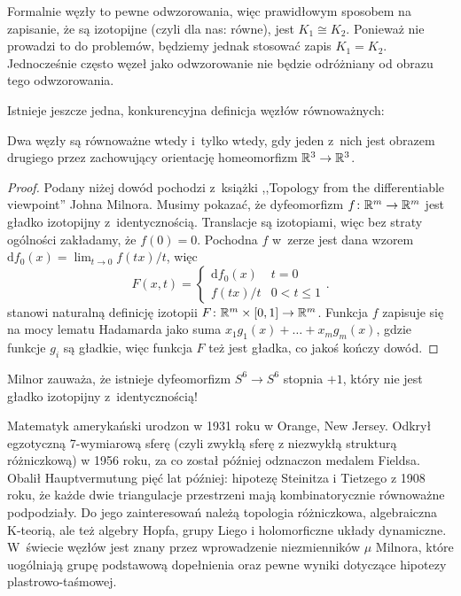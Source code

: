 Formalnie węzły to pewne odwzorowania, więc prawidłowym sposobem na zapisanie, że są izotopijne (czyli dla nas: równe), jest $K_1 \cong K_2$.
Ponieważ nie prowadzi to do problemów, będziemy jednak stosować zapis $K_1 = K_2$.
Jednocześnie często węzeł jako odwzorowanie nie będzie odróżniany od obrazu tego odwzorowania.

Istnieje jeszcze jedna, konkurencyjna definicja węzłów równoważnych:

\begin{proposition}
\label{def:equivalent_knots_2}%
    Dwa węzły są równoważne wtedy i~tylko wtedy, gdy jeden z~nich jest obrazem drugiego przez zachowujący orientację homeomorfizm $\mathbb R^3 \to \mathbb R^3$.
\end{proposition}

\begin{proof}
    Podany niżej dowód pochodzi z~książki ,,Topology from the differentiable viewpoint'' Johna Milnora.
%
    Musimy pokazać, że dyfeomorfizm $f \colon \mathbb R^m \to \mathbb R^m$ jest gładko izotopijny z~identycznością.
    Translacje są izotopiami, więc bez straty ogólności zakładamy, że $f(0) = 0$.
    Pochodna $f$ w~zerze jest dana wzorem $\mathrm{d}f_0(x) = \lim_{t \to 0} f(tx) /t$, więc
    \begin{equation}
        F(x, t) = \begin{cases}
            \mathrm{d}f_0(x) & t = 0 \\
            f(tx) / t & 0 < t \le 1
        \end{cases} .
    \end{equation}
    stanowi naturalną definicję izotopii $F \colon \mathbb R^m \times [0, 1] \to \mathbb R^m$.
    Funkcja $f$ zapisuje się na mocy lematu Hadamarda jako suma $x_1 g_1(x) + \ldots + x_mg_m(x)$, gdzie funkcje $g_i$ są gładkie, więc funkcja $F$ też jest gładka, co jakoś kończy dowód.
%    
\end{proof}

Milnor zauważa, że istnieje dyfeomorfizm $S^6 \to S^6$ stopnia $+1$, który nie jest gładko izotopijny z~identycznością!
%

\begin{remark}
    Matematyk amerykański urodzon w 1931 roku w Orange, New Jersey.
    Odkrył egzotyczną 7-wymiarową sferę (czyli zwykłą sferę z niezwykłą strukturą różniczkową) w 1956 roku, za co został później odznaczon medalem Fieldsa.
    Obalił Hauptvermutung pięć lat później: hipotezę Steinitza i Tietzego z 1908 roku, że każde dwie triangulacje przestrzeni mają kombinatorycznie równoważne podpodziały.
    Do jego zainteresowań należą topologia różniczkowa, algebraiczna K-teorią, ale też algebry Hopfa, grupy Liego i holomorficzne układy dynamiczne.
    W~świecie węzłów jest znany przez wprowadzenie niezmienników $\mu$ Milnora, które uogólniają grupę podstawową dopełnienia oraz pewne wyniki dotyczące hipotezy plastrowo-taśmowej.
\end{remark}
%
%
%

